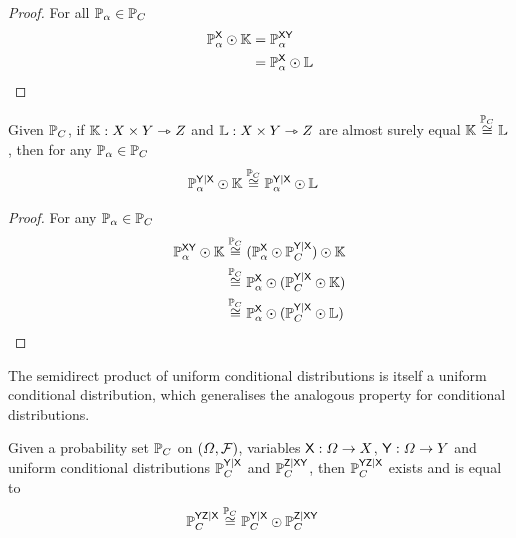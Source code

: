 \begin{proof}
For all $\mathbb{P}_\alpha \in \mathbb{P}_C$
\begin{align}
    \mathbb{P}^{\mathsf{X}}_\alpha\odot \mathbb{K} &= \mathbb{P}^{\mathsf{XY}}_\alpha\\
    &= \mathbb{P}^{\mathsf{X}}_\alpha\odot \mathbb{L}
\end{align}
\end{proof}

\begin{lemma}\label{lem:sub_asequal}
Given $\mathbb{P}_C$, if $\mathbb{K}:X\times Y \rightarrowtriangle Z$ and $\mathbb{L}:X\times Y \rightarrowtriangle Z$ are almost surely equal $\mathbb{K}\overset{\mathbb{P}_C}{\cong}\mathbb{L}$, then for any $\mathbb{P}_\alpha\in \mathbb{P}_C$
\begin{align}
    \mathbb{P}_\alpha^{\mathsf{Y}|\mathsf{X}}\odot \mathbb{K} &\overset{\mathbb{P}_C}{\cong} \mathbb{P}_\alpha^{\mathsf{Y}|\mathsf{X}}\odot \mathbb{L}
\end{align}
\end{lemma}

\begin{proof}
For any $\mathbb{P}_\alpha\in\mathbb{P}_C$
\begin{align}
    \mathbb{P}_\alpha^{\mathsf{XY}}\odot \mathbb{K} &\overset{\mathbb{P}_C}{\cong} (\mathbb{P}_\alpha^{\mathsf{X}}\odot \mathbb{P}_C^{\mathsf{Y}|\mathsf{X}})\odot \mathbb{K}\\
                                              &\overset{\mathbb{P}_C}{\cong} \mathbb{P}_\alpha^{\mathsf{X}}\odot (\mathbb{P}_C^{\mathsf{Y}|\mathsf{X}}\odot \mathbb{K})\\
                                              &\overset{\mathbb{P}_C}{\cong} \mathbb{P}_\alpha^{\mathsf{X}}\odot (\mathbb{P}_C^{\mathsf{Y}|\mathsf{X}}\odot \mathbb{L})
\end{align}
\end{proof}

The semidirect product of uniform conditional distributions is itself a uniform conditional distribution, which generalises the analogous property for conditional distributions.

\begin{theorem}\label{lem:joint_conditional}
Given a probability set $\mathbb{P}_C$ on $(\Omega,\mathcal{F})$, variables $\mathsf{X}:\Omega\to X$, $\mathsf{Y}:\Omega\to Y$ and uniform conditional distributions $\mathbb{P}_C^{\mathsf{Y}|\mathsf{X}}$ and $\mathbb{P}_C^{\mathsf{Z}|\mathsf{XY}}$, then $\mathbb{P}_C^{\mathsf{YZ}|\mathsf{X}}$ exists and is equal to
\begin{align}
    \mathbb{P}_C^{\mathsf{YZ}|\mathsf{X}} &\overset{\mathbb{P}_C}{\cong} \mathbb{P}_C^{\mathsf{Y}|\mathsf{X}}\odot \mathbb{P}_C^{\mathsf{Z}|\mathsf{XY}}
\end{align}
\end{theorem}

